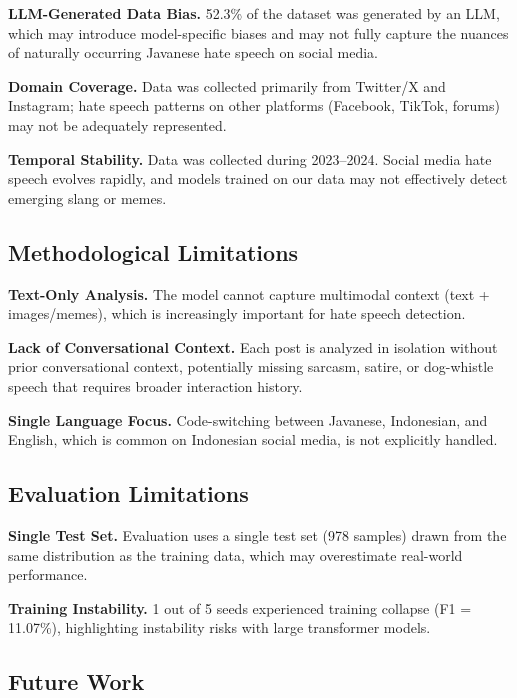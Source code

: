 \documentclass[10pt,twocolumn]{article}
\begin{document}
\textbf{LLM-Generated Data Bias.} 52.3\% of the dataset was generated by an LLM, which may introduce model-specific biases and may not fully capture the nuances of naturally occurring Javanese hate speech on social media.

\textbf{Domain Coverage.} Data was collected primarily from Twitter/X and Instagram; hate speech patterns on other platforms (Facebook, TikTok, forums) may not be adequately represented.

\textbf{Temporal Stability.} Data was collected during 2023--2024. Social media hate speech evolves rapidly, and models trained on our data may not effectively detect emerging slang or memes.

\subsection{Methodological Limitations}

\textbf{Text-Only Analysis.} The model cannot capture multimodal context (text + images/memes), which is increasingly important for hate speech detection.

\textbf{Lack of Conversational Context.} Each post is analyzed in isolation without prior conversational context, potentially missing sarcasm, satire, or dog-whistle speech that requires broader interaction history.

\textbf{Single Language Focus.} Code-switching between Javanese, Indonesian, and English, which is common on Indonesian social media, is not explicitly handled.

\subsection{Evaluation Limitations}

\textbf{Single Test Set.} Evaluation uses a single test set (978 samples) drawn from the same distribution as the training data, which may overestimate real-world performance.

\textbf{Training Instability.} 1 out of 5 seeds experienced training collapse (F1 = 11.07\%), highlighting instability risks with large transformer models.

\subsection{Future Work}
\end{document}
